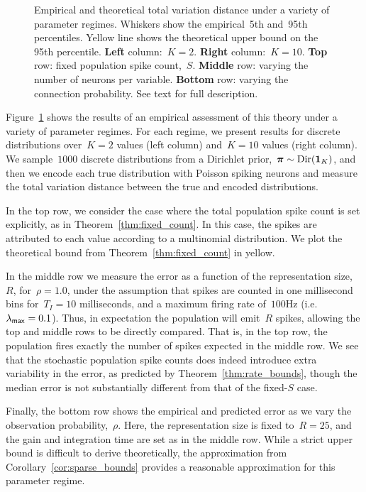 \begin{figure}[t!]
\begin{subfigure}[b]{2.75in}
 \end{subfigure}
 \vspace{-.3in}
 \caption[Empirical and Theoretical Total Variation Distance]
 {Empirical and theoretical total variation distance under a variety 
   of parameter regimes. Whiskers show the empirical~5th 
   and~95th percentiles. Yellow line shows the theoretical
   upper bound on the 95th percentile. 
   \textbf{Left} column:~$K=2$. \textbf{Right} column:~$K=10$. 
   \textbf{Top} row: fixed population spike count,~$S$. 
   \textbf{Middle} row: varying the number of neurons per variable.
   \textbf{Bottom} row: varying the connection probability.
   See text for full description.
 }
 \label{fig:complexity}
\end{figure}

Figure~\ref{fig:complexity} shows the results of an empirical 
assessment of this theory under a variety of parameter regimes.
For each regime, we present results for discrete distributions
over~$K=2$ values (left column) and~$K=10$ values (right column). We 
sample~$1000$ discrete distributions from a Dirichlet 
prior,~${\boldsymbol{\pi} \sim \mathrm{Dir}(\boldsymbol{1}_K)}$, and then we encode each true 
distribution with Poisson spiking neurons and measure the total 
variation distance between the true and encoded distributions. 

In the top row, we consider the case where the total population 
spike count is set explicitly, as in Theorem~\ref{thm:fixed_count}.
In this case, the spikes are attributed to each value according 
to a multinomial distribution. We plot the theoretical bound from
Theorem~\ref{thm:fixed_count} in yellow.

In the middle row we measure the error as a function of the
representation size,~$R$, for~$\rho=1.0$, under the assumption that
spikes are counted in one millisecond bins for~$T_I=10$ milliseconds,
and a maximum firing rate of~$100$Hz (i.e.~$\lambda_{\mathsf{max}}=0.1$). Thus, in
expectation the population will emit~$R$ spikes, allowing the top and
middle rows to be directly compared. That is, in the top row, the
population fires exactly the number of spikes expected in the middle
row.  We see that the stochastic population spike counts does indeed
introduce extra variability in the error, as predicted by
Theorem~\ref{thm:rate_bounds}, though the median error is not
substantially different from that of the fixed-$S$ case.

Finally, the bottom row shows the empirical and predicted error as 
we vary the observation probability,~$\rho$. Here, the representation 
size is fixed to~$R=25$, and the gain and integration time are 
set as in the middle row. While a strict upper bound is difficult 
to derive theoretically, the approximation from 
Corollary~\ref{cor:sparse_bounds} provides a reasonable 
approximation for this parameter regime.

